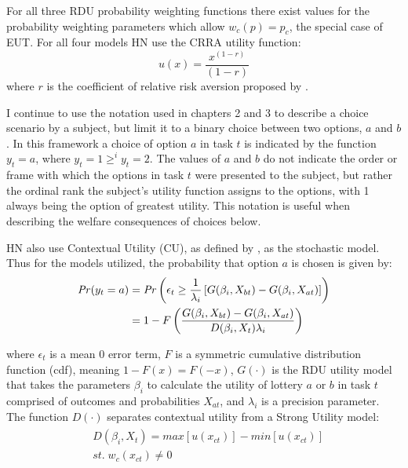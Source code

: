 \documentclass[../main.tex]{subfiles}
\begin{document}
For all three RDU probability weighting functions there exist values for the probability weighting parameters which allow $w_c(p) = p_c$, the special case of EUT.
For all four models HN use the CRRA utility function:
\begin{equation}
	\label{eq4:CRRA}
	u(x) = \frac{x^{(1-r)}}{(1-r)}
\end{equation}
\noindent where $r$ is the coefficient of relative risk aversion proposed by \textcite{Pratt1964}.

I continue to use the notation used in chapters 2 and 3 to describe a choice scenario by a subject, but limit it to a binary choice between two options, $a$ and $b$.
In this framework a choice of option $a$ in task $t$ is indicated by the function $y_t = a$, where $y_t = 1 \geq^i y_t = 2$.
The values of $a$ and $b$ do not indicate the order or frame with which the options in task $t$ were presented to the subject, but rather the ordinal rank the subject's utility function assigns to the options, with 1 always being the option of greatest utility.
This notation is useful when describing the welfare consequences of choices below.

HN also use Contextual Utility (CU), as defined by \textcite{Wilcox2008}, as the stochastic model.
Thus for the models utilized, the probability that option $a$ is chosen is given by:
\begin{align}
	\label{eq4:RE.2}
	\begin{split}
		{\ensuremath{\mathit{Pr}}}(y_t = a) &= {\mathit{Pr}}\left(  \epsilon_t \geq \frac{1}{\lambda_i} \left[ G(\beta_i,X_{bt}) - G(\beta_i,X_{at}) \right] \right)\\
		&= 1 - F\left( \dfrac{G(\beta_i,X_{bt}) - G(\beta_i,X_{at})}{D(\beta_i,X_t)\lambda_i }  \right)
	\end{split}
\end{align}

\noindent where $\epsilon_t$ is a mean 0 error term, $F$ is a symmetric cumulative distribution function (cdf), meaning $1 - F(x)  = F(-x)$, $G(\cdot)$ is the RDU utility model that takes the parameters $\beta_i$ to calculate the utility of lottery $a$ or $b$ in task $t$ comprised of outcomes and probabilities $X_{at}$, and $\lambda_i$ is a precision parameter.
The function $D(\cdot)$ separates contextual utility from a Strong Utility model:
\begin{align}
	\label{eq4:W.cu}
	\begin{split}
		&D(\beta_i,X_t) = \mathit{max}[u(x_{ct})] - \mathit{min}[u(x_{ct})]\\
		&\mathit{st.}\; w_c(x_{ct}) \neq 0
	\end{split}
\end{align}
\end{document}
